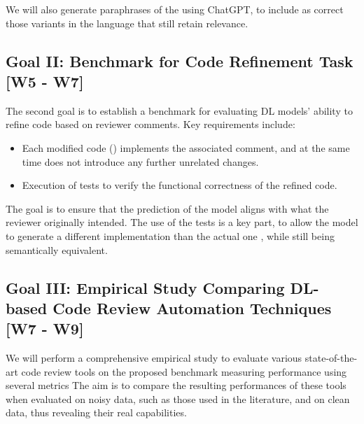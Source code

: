 
We will also generate paraphrases of the \revComment using ChatGPT, to include 
as correct those variants in the language that still retain relevance.

\subsection{Goal II: Benchmark for Code Refinement Task [W5 - W7]}
The second goal is to establish a benchmark for evaluating DL models' ability
to refine code based on reviewer comments. 
Key requirements include:
\begin{itemize}
    \item Each modified code (\revCode) implements the associated comment, and at the same time does not introduce any further unrelated changes.
    \item Execution of tests to verify the functional correctness of the refined code.
\end{itemize}

The goal is to ensure that the prediction of the model aligns with what the
reviewer originally intended. The use of the tests is a key part, to allow the model to 
generate a different implementation than the actual one \revCode,
while still being semantically equivalent.

\subsection{Goal III: Empirical Study Comparing DL-based Code Review Automation
    Techniques [W7 - W9]}
We will perform a comprehensive empirical study to evaluate various 
state-of-the-art code review tools on the proposed benchmark measuring performance using several metrics %
The aim is to compare the resulting performances of these tools when 
evaluated on noisy data, such as those used in the literature, and on clean data, thus revealing their real capabilities.

